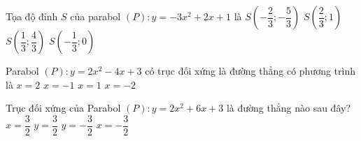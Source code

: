 \begin{ex}%
	Tọa độ đỉnh $S$ của parabol $\left(P\right)\colon y=-3x^2+2x+1$ là
	\choice
	{$S\left( -\dfrac{2}{3}; -\dfrac{5}{3} \right)$}
	{$S\left( \dfrac{2}{3}; 1 \right)$}
	{\True $S\left( \dfrac{1}{3}; \dfrac{4}{3} \right)$}
	{$S\left( -\dfrac{1}{3}; 0 \right)$}
	
\end{ex}


\begin{ex}%
	Parabol $\left(P\right)\colon y=2x^2-4x+3$ có trục đối xứng là đường thẳng có phương trình là
	\choice
	{$x=2$}
	{$x=-1$}
	{\True $x=1$}
	{$x=-2$}
\end{ex}


\begin{ex}%
	Trục đối xứng của Parabol $(P)\colon y=2x^2+6x+3$ là đường thẳng nào sau đây?
	\choice
	{$x=\dfrac{3}{2} $}
	{$y=\dfrac{3}{2} $}
	{$y=-\dfrac{3}{2} $}
	{\True $x=-\dfrac{3}{2} $}
\end{ex}


